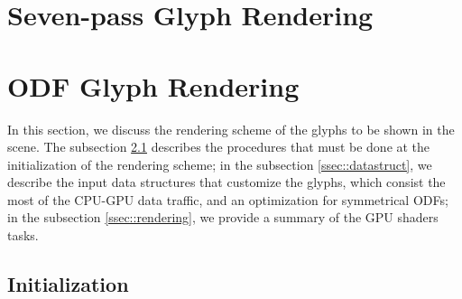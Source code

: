 \documentclass[twoside,twocolumn,10pt]{article}
\begin{document}
\section{Seven-pass Glyph Rendering}
\label{sec:superquadric_rendering}


\section{ODF Glyph Rendering}
\label{sec::odf_glyph_rendering}

In this section, we discuss the rendering scheme of the glyphs to be shown in the scene. The subsection \ref{ssec::precomputation} describes the procedures that must be done at the initialization of the rendering scheme; in the subsection \ref{ssec::datastruct}, we describe the input data structures that customize the glyphs, which consist the most of the CPU-GPU data traffic, and an optimization for symmetrical ODFs; in the subsection \ref{ssec::rendering}, we provide a summary of the GPU shaders tasks.






\subsection{Initialization}
\label{ssec::precomputation}
\end{document}
